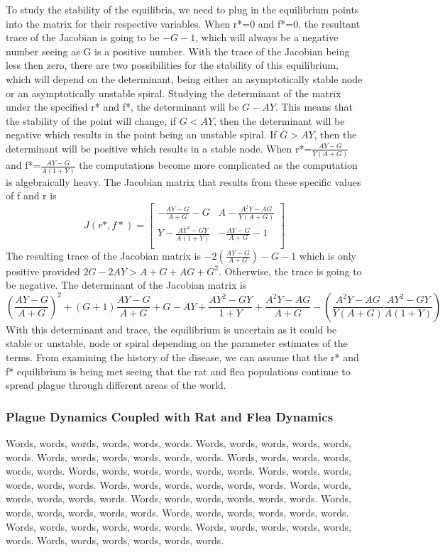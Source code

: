 \documentclass [letterpaper, 12pt] {article}
\begin{document}
To study the stability of the equilibria, we need to plug in the equilibrium points
into the matrix for their respective variables. When r*=0 and f*=0, the resultant trace
of the Jacobian is going to be $-G-1$, which will always be a negative number seeing as G is a positive number. 
With the trace of the Jacobian being less then zero, there are two
possibilities for the stability of this equilibrium, which will depend on the determinant, being either an
asymptotically stable node or an asymptotically unstable spiral. Studying the determinant of the matrix
under the specified r* and f*, the determinant will be $G-AY$. This means that the stability of the point
will change, if $G<AY$, then the determinant will be negative which results in the point being an unstable
spiral. If $G>AY$, then the determinant will be positive which results in a stable node. When 
r*=$\frac{AY-G}{Y(A+G)}$ and f*=$\frac{AY-G}{A(1+Y)}$ the computations become more
complicated as the computation is algebraically heavy. The Jacobian matrix that results
from these specific values of f and r is
\begin{equation}
J(r*, f*)=
\begin{bmatrix}
-\frac{AY-G}{A+G}-G & A-\frac{A^{2}Y-AG}{Y(A+G)} \\
Y-\frac{AY^{2}-GY}{A(1+Y)} & -\frac{AY-G}{A+G}-1 \\
\end{bmatrix}
\end{equation}
The resulting trace of the Jacobian matrix is $-2(\frac{AY-G}{A+G})-G-1$ which is only positive
provided $2G-2AY>A+G+AG+G^{2}$. Otherwise, the trace is going to be negative. The determinant
of the Jacobian matrix is $$(\frac{AY-G}{A+G})^{2} + (G+1)\frac{AY-G}{A+G}+G-AY+\frac{AY^{2}-GY}{1+Y} + \frac{A^{2}Y-AG}{A+G}-(\frac{A^{2}Y-AG}{Y(A+G)}\frac{AY^{2}-GY}{A(1+Y)})$$
With this determinant and trace, the equilibrium is uncertain as it could be stable or unstable, node or spiral
depending on the parameter estimates of the terms. From examining the history of the disease,
we can assume that the r* and f* equilibrium is being met seeing that the rat and flea
populations continue to spread plague through different areas of the world.

\pagebreak

\subsubsection{Plague Dynamics Coupled with Rat and Flea Dynamics}

Words, words, words, words, words, words. Words, words, words, words, words, words. Words, words, words, words, words, words. Words, words, words, words, words, words. Words, words, words, words, words, words. Words, words, words, words, words, words. Words, words, words, words, words, words. Words, words, words, words, words, words. Words, words, words, words, words, words. Words, words, words, words, words, words. Words, words, words, words, words, words. Words, words, words, words, words, words. Words, words, words, words, words, words. Words, words, words, words, words, words. 
\end{document}
